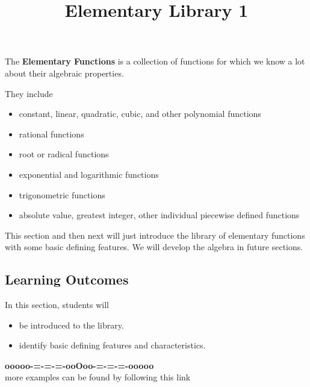 \documentclass{ximera}
\title{Elementary Library 1}
\begin{document}
\begin{abstract}
\end{abstract}
\maketitle




The \textbf{Elementary Functions} is a collection of functions for which we know a lot about their algebraic properties.

They include 

\begin{itemize}
\item constant, linear, quadratic, cubic, and other polynomial functions
\item rational functions
\item root or radical functions
\item exponential and logarithmic functions
\item trigonometric functions
\item absolute value, greatest integer, other individual piecewise defined functions
\end{itemize}



This section and then next will just introduce the library of elementary functions with some basic defining features.  We will develop the algebra in future sections.












\subsection*{Learning Outcomes}

\begin{sectionOutcomes}
In this section, students will 

\begin{itemize}
\item be introduced to the library.
\item identify basic defining features and characteristics.
\end{itemize}
\end{sectionOutcomes}







\begin{center}
\textbf{\textcolor{green!50!black}{ooooo-=-=-=-ooOoo-=-=-=-ooooo}} \\

more examples can be found by following this link\\ 

\end{center}
\end{document}
